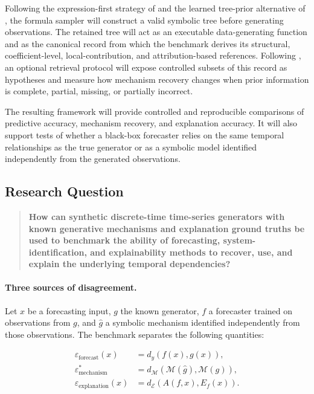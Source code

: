 Following the expression-first strategy of \citet{dascoli2022deep} and the
learned tree-prior alternative of \citet{meznar2023efficient}, the formula
sampler will construct a valid symbolic tree before generating observations.
The retained tree will act as an executable data-generating function and as the
canonical record from which the benchmark derives its structural,
coefficient-level, local-contribution, and attribution-based references.
Following \citet{bendinelli2023controllable}, an optional retrieval protocol
will expose controlled subsets of this record as hypotheses and measure how
mechanism recovery changes when prior information is complete, partial,
missing, or partially incorrect.

The resulting framework will provide controlled and reproducible comparisons
of predictive accuracy, mechanism recovery, and explanation accuracy. It will
also support tests of whether a black-box forecaster relies on the same
temporal relationships as the true generator or as a symbolic model identified
independently from the generated observations.

\subsection{\texorpdfstring{\hspace{0.45em}Research Question}{Research Question}}

\begin{quote}
\textbf{How can synthetic discrete-time time-series generators with known
generative mechanisms and explanation ground truths be used to benchmark the
ability of forecasting, system-identification, and explainability methods to
recover, use, and explain the underlying temporal dependencies?}
\end{quote}

\paragraph{Three sources of disagreement.}
Let $x$ be a forecasting input, $g$ the known generator, $f$ a forecaster
trained on observations from $g$, and $\widehat g$ a symbolic mechanism
identified independently from those observations. The benchmark separates the
following quantities:

\begin{align}
\varepsilon_{\mathrm{forecast}}(x)
&=d_y\!\left(f(x),g(x)\right),
\label{eq:forecast-error}\\
\varepsilon_{\mathrm{mechanism}}^{*}
&=d_{\mathcal M}\!\left(\mathcal M(\widehat g),\mathcal M(g)\right),
\label{eq:mechanism-error}\\
\varepsilon_{\mathrm{explanation}}(x)
&=d_{\mathcal E}\!\left(A(f,x),E_f(x)\right).
\label{eq:explanation-error}
\end{align}


